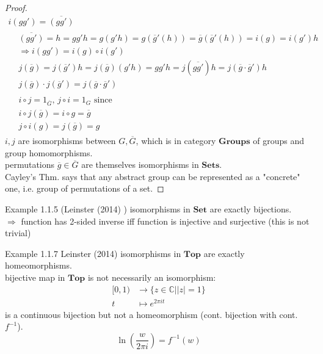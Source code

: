 \documentclass[10pt]{amsart}
\begin{document}
\begin{multicols*}{2}
\begin{proof}
	\[
	\begin{gathered} 
	i(gg') = \overline{(gg')} \\
	\begin{aligned}
	& \overline{(gg')} = h = gg' h = g(g'h) = g(\overline{g}'(h)) = \overline{g}(\overline{g}'(h)) = i(g) = i(g') h \\ 
	& \Longrightarrow i(gg') = i(g) \circ i(g') \\
	& j(\overline{g}) = j(\overline{g}') h = j(\overline{g}) (g'h) = gg'h = j(\overline{gg'})h = j(\overline{g} \cdot \overline{g}') h \\
	& j(\overline{g}) \cdot j(\overline{g}') = j(\overline{g} \cdot \overline{g}')
	\end{aligned} \\
	\begin{aligned}
	& i\circ j = 1_{\overline{G}}, \, j \circ i = 1_G \text{ since } \\
	& i \circ j (\overline{g}) = i\circ g = \overline{g} \\
	& j\circ i (g) = j(\overline{g}) = g
	\end{aligned}
\end{gathered} 	
	\]
	$i,j$ are isomorphisms between $G,\overline{G}$, which is in category $\textbf{Groups}$ of groups and group homomorphisms. \\
	permutations $\overline{g} \in \overline{G}$ are themselves isomorphisms in $\textbf{Sets}$. \\
	Cayley's Thm. says that any abstract group can be represented as a "concrete" one, i.e. group of permutations of a set.
\end{proof}

Example 1.1.5 (Leinster (2014) \cite{Lein2014}) isomorphisms in $\textbf{Set}$ are exactly bijections. \\
$\Longrightarrow $ function has 2-sided inverse iff function is injective and surjective (this is not trivial)

Example 1.1.7 Leinster (2014) \cite{Lein2014} isomorphisms in $\textbf{Top}$ are exactly homeomorphisms. \\
bijective map in $\textbf{Top}$ is not necessarily an isomorphism:
\[
\begin{aligned}
	[0, 1) & \to \lbrace z \in \mathbb{C} | |z| = 1 \rbrace \\
	t & \mapsto e^{2\pi i t}
\end{aligned}
\]
is a continuous bijection but not a homeomorphism (cont. bijection with cont. $f^{-1}$). 
\[
\ln{ \left( \frac{w}{2\pi i} \right) } = f^{-1}(w)
\]


\end{multicols*}
\end{document}
